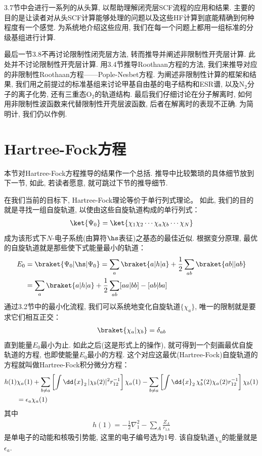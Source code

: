 3.7节中会进行一系列的从头算, 以帮助理解闭壳层SCF流程的应用和结果. 
主要的目的是让读者对从头SCF计算能够处理的问题以及这些HF计算到底能精确到何种程度有一个感觉. 
为系统地介绍这些应用, 
我们在每一个问题上都用一组标准的分级基组进行计算.

最后一节3.8不再讨论限制性闭壳层方法, 
转而推导并阐述非限制性开壳层计算. 
此处并不讨论限制性开壳层计算. 
用3.4节推导Roothaan方程的方法, 
我们来推导对应的非限制性Roothaan方程——Pople-Nesbet方程. 
为阐述非限制性计算的框架和结果, 
我们用之前提过的标准基组来讨论甲基自由基的电子结构和ESR谱, 
以及$\mathrm{N}_2$分子的离子化势, 
还有三重态$\mathrm{O}_2$的轨道结构. 
最后我们仔细讨论在分子解离时, 
如何用非限制性波函数来代替限制性开壳层波函数, 
后者在解离时的表现不正确. 
为简明计, 
我们仍以作例.


\section{Hartree-Fock方程}
本节对Hartree-Fock方程推导的结果作一个总括. 
推导中比较繁琐的具体细节放到下一节, 
如此, 
若读者愿意, 
就可跳过下节的推导细节. 


在我们当前的目标下, 
Hartree-Fock理论等价于单行列式理论。
如此, 我们的目的就是寻找一组自旋轨道, 
以使由这些自旋轨道构成的单行列式：
\begin{align}
	\ket{\Psi_0} = \ket{\chi_1\chi_2\cdots\chi_a\chi_b\cdots\chi_N}
\end{align}
成为该形式下$N$-电子系统(由算符$\hs$表征)之基态的最佳近似. 
根据变分原理, 
最优的自旋轨道就是那些使下式能量最小的轨道：
\begin{align}
	E_0 & = \braket{\Psi_0|\hs|\Psi_0} = \sum_a\braket{a|h|a} + \frac{1}{2}\sum_{ab}\braket{ab||ab}\notag \\
	& = \sum_a\braket{a|h|a} + \frac{1}{2}\sum_{ab}[aa|bb]-[ab|ba]
\end{align}
通过3.2节中的最小化流程, 
我们可以系统地变化自旋轨道$\{\chi_a\}$, 
唯一的限制就是要求它们相互正交：
\begin{align}
	\braket{\chi_a|\chi_b} = \delta_{ab}
\end{align} 
直到能量$E_0$最小为止. 
如此之后(这是形式上的操作), 
就可得到一个刻画最优自旋轨道的方程, 
也即使能量$E_0$最小的方程. 
这个对应这最优(Hartree-Fock)自旋轨道的方程就叫做Hartree-Fock积分微分方程：
\begin{align}
	\label{3.4}
	h(1)&\chi_a(1) + \sum_{b\neq a}\left[ \int\dd{x}_2\,|\chi_b(2)|^2 r_{12}^{-1} \right]\chi_a(1) - \sum_{b\neq a}\left[ \int\dd{x}_2\,\chi_b^*(2)\chi_a(2) r_{12}^{-1} \right]\chi_b(1)\notag\\
	&=\epsilon_a\chi_a(1)
\end{align}
其中
\begin{align}
	h(1) = -\frac{1}{2}\nabla_1^2 - \sum_A\frac{Z_A}{r_{1A}}
\end{align}
是单电子的动能和核吸引势能, 
这里的电子编号选为1号. 
该自旋轨道$\chi_a$的能量就是$\epsilon_a$.


